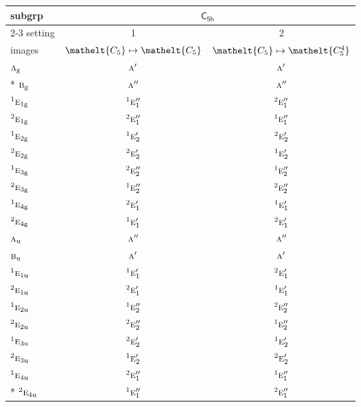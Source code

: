 \documentclass[10pt,a4paper]{article}
\numberwithin{equation}{section}
\newcommand{\eltfont}[1]{{\let\sigma\eltsigma\mathelt{#1}}}
\newcommand{\grp}[1]{\mathsf{#1}}
\newcommand{\irr}[1]{\text{\normalfont\scshape #1}}
\newcommand{\conjpair}[1]{{}^{#1}}
\newcommand{\cls}[1]{\eltfont{#1}}
\newcommand{\ptag}[1]{\mathrm{#1}}
\begin{document}
{\small\begin{longtable}{@{}lcc@{}}\toprule
subgrp & \multicolumn{2}{c}{\href{C5h.pdf}{$\grp{C_{5h}}$}}\\\cmidrule(lr){2-3}
setting & 1 & 2\\
images & {\scriptsize $\cls{C_{5}} \mapsto \cls{C_{5}}$} & {\scriptsize $\cls{C_{5}} \mapsto \cls{C_{5}^{4}}$}\\\midrule\endhead
\bottomrule\endfoot\endlastfoot
$\irr{a}_{\ptag{g}}$ & $\irr{a}'$ & $\irr{a}'$\\*
$\irr{b}_{\ptag{g}}$ & $\irr{a}''$ & $\irr{a}''$\\
$\conjpair{1}\irr{e}_{1\ptag{g}}$ & $\conjpair{1}\irr{e}_{1}''$ & $\conjpair{2}\irr{e}_{1}''$\\
$\conjpair{2}\irr{e}_{1\ptag{g}}$ & $\conjpair{2}\irr{e}_{1}''$ & $\conjpair{1}\irr{e}_{1}''$\\
$\conjpair{1}\irr{e}_{2\ptag{g}}$ & $\conjpair{1}\irr{e}_{2}'$ & $\conjpair{2}\irr{e}_{2}'$\\
$\conjpair{2}\irr{e}_{2\ptag{g}}$ & $\conjpair{2}\irr{e}_{2}'$ & $\conjpair{1}\irr{e}_{2}'$\\
$\conjpair{1}\irr{e}_{3\ptag{g}}$ & $\conjpair{2}\irr{e}_{2}''$ & $\conjpair{1}\irr{e}_{2}''$\\
$\conjpair{2}\irr{e}_{3\ptag{g}}$ & $\conjpair{1}\irr{e}_{2}''$ & $\conjpair{2}\irr{e}_{2}''$\\
$\conjpair{1}\irr{e}_{4\ptag{g}}$ & $\conjpair{2}\irr{e}_{1}'$ & $\conjpair{1}\irr{e}_{1}'$\\
$\conjpair{2}\irr{e}_{4\ptag{g}}$ & $\conjpair{1}\irr{e}_{1}'$ & $\conjpair{2}\irr{e}_{1}'$\\
$\irr{a}_{\ptag{u}}$ & $\irr{a}''$ & $\irr{a}''$\\
$\irr{b}_{\ptag{u}}$ & $\irr{a}'$ & $\irr{a}'$\\
$\conjpair{1}\irr{e}_{1\ptag{u}}$ & $\conjpair{1}\irr{e}_{1}'$ & $\conjpair{2}\irr{e}_{1}'$\\
$\conjpair{2}\irr{e}_{1\ptag{u}}$ & $\conjpair{2}\irr{e}_{1}'$ & $\conjpair{1}\irr{e}_{1}'$\\
$\conjpair{1}\irr{e}_{2\ptag{u}}$ & $\conjpair{1}\irr{e}_{2}''$ & $\conjpair{2}\irr{e}_{2}''$\\
$\conjpair{2}\irr{e}_{2\ptag{u}}$ & $\conjpair{2}\irr{e}_{2}''$ & $\conjpair{1}\irr{e}_{2}''$\\
$\conjpair{1}\irr{e}_{3\ptag{u}}$ & $\conjpair{2}\irr{e}_{2}'$ & $\conjpair{1}\irr{e}_{2}'$\\
$\conjpair{2}\irr{e}_{3\ptag{u}}$ & $\conjpair{1}\irr{e}_{2}'$ & $\conjpair{2}\irr{e}_{2}'$\\
$\conjpair{1}\irr{e}_{4\ptag{u}}$ & $\conjpair{2}\irr{e}_{1}''$ & $\conjpair{1}\irr{e}_{1}''$\\*
$\conjpair{2}\irr{e}_{4\ptag{u}}$ & $\conjpair{1}\irr{e}_{1}''$ & $\conjpair{2}\irr{e}_{1}''$\\
\bottomrule\end{longtable}}
\end{document}

